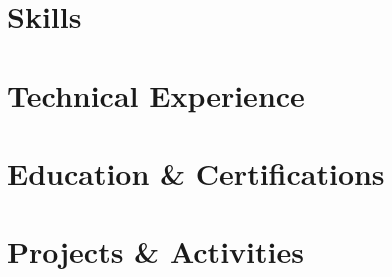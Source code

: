 \documentclass[letter,10pt]{article}
\begin{document}


\section{Skills}


\section{Technical Experience}


\section{Education \& Certifications}



\section{Projects \& Activities}

\end{document}
